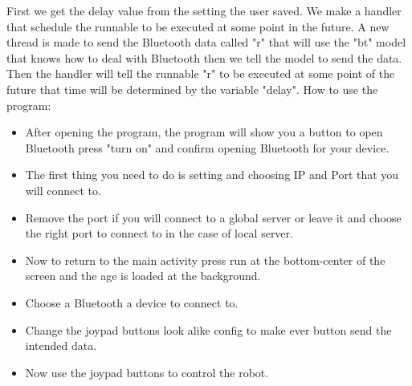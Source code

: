 		First we get the delay value from the setting the user saved.
		We make a handler that schedule the runnable to be executed at some point in the future.
		A new thread is made to send the Bluetooth data called "r" that will use the "bt" model that knows how to deal with Bluetooth then we tell the model to send the data.
		Then the handler will tell the runnable "r" to be executed at some point of the future that time will be determined by the variable "delay".
	How to use the program:
	\begin{itemize}
		\item After opening the program, the program will show you a button to open Bluetooth press "turn on" and confirm opening Bluetooth for your device.
		\item The first thing you need to do is setting and choosing IP and Port that you will connect to.
		\item Remove the port if you will connect to a global server or leave it and choose the right port to connect to in the case of local server.
		\item Now to return to the main activity press run at the bottom-center of the screen and the age is loaded at the background.
		\item Choose a Bluetooth a device to connect to.
		\item Change the joypad buttons look alike config to make ever button send the intended data.
		\item Now use the joypad buttons to control the robot.
	\end{itemize}
		
